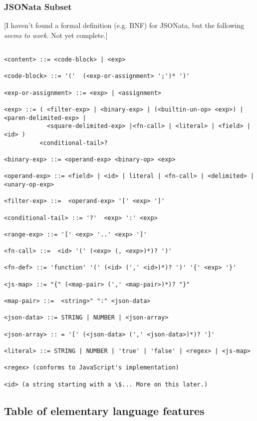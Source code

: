 \documentclass[9pt,letterpaper]{article}
\begin{document}
\subsubsection{JSONata Subset}
[I haven't found a formal definition (e.g. BNF) for JSONata, but the following \textit{seems to work}. Not yet complete.]

\begin{Verbatim}[fontsize=\footnotesize]

<content> ::= <code-block> | <exp>

<code-block> ::= '('  (<exp-or-assignment> ';')* ')'

<exp-or-assignment> ::= <exp> | <assignment>

<exp> ::= ( <filter-exp> | <binary-exp> | (<builtin-un-op> <exp>) | <paren-delimited-exp> |
            <square-delimited-exp> |<fn-call> | <literal> | <field> | <id> )
          <conditional-tail>?

<binary-exp> ::= <operand-exp> <binary-op> <exp>

<operand-exp> ::= <field> | <id> | literal | <fn-call> | <delimited> | <unary-op-exp>

<filter-exp> ::=  <operand-exp> '[' <exp> ']'

<conditional-tail> ::= '?'  <exp> ':' <exp>

<range-exp> ::= '[' <exp> '..' <exp> ']'

<fn-call> ::=  <id> '(' (<exp> (, <exp>)*)? ')'

<fn-def> ::= 'function' '(' (<id> (',' <id>)*)? ')' '{' <exp> '}'

<js-map> ::= "{" (<map-pair> (',' <map-pair>)*)? "}"

<map-pair> ::=  <string>" ":" <json-data>

<json-data> ::= STRING | NUMBER | <json-array>

<json-array> :: = '[' (<json-data> (',' <json-data>)*)? ']'

<literal> ::= STRING | NUMBER | 'true' | 'false' | <regex> | <js-map>

<regex> (conforms to JavaScript's implementation)

<id> (a string starting with a \$... More on this later.)

\end{Verbatim}

\subsection{Table of elementary language features}
\end{document}
